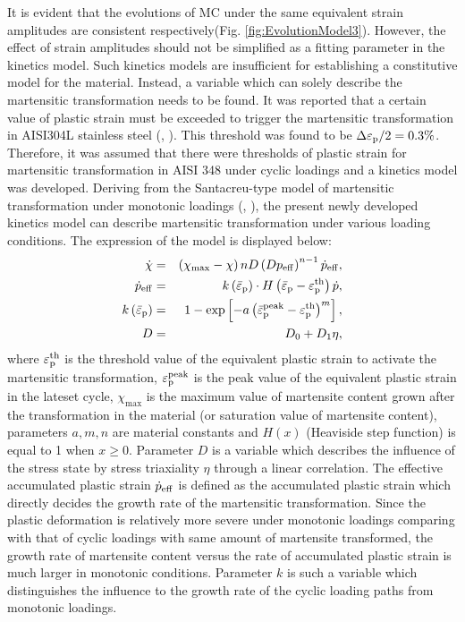 \documentclass[preprint,5p,twocolumn,10pt,sort&compress]{elsarticle}
\begin{document}
 It is evident that the evolutions of MC under the same equivalent strain amplitudes are consistent respectively(Fig. \ref{fig:EvolutionModel3}). However, the effect of strain amplitudes should not be simplified as a fitting parameter in the kinetics model. Such kinetics models are insufficient for establishing a constitutive model for the material. Instead, a variable which can solely describe the martensitic transformation needs to be found. It was reported that a certain value of plastic strain must be exceeded to trigger the martensitic transformation in AISI304L stainless steel (\citeauthor{Bayerlein1989Plasticity}, \citeyear{Bayerlein1989Plasticity}). This threshold was found to be $\Delta \varepsilon _{\rm p}/2=0.3\%$. Therefore, it was assumed that there were thresholds of plastic strain for martensitic transformation in AISI 348 under cyclic loadings and a kinetics model was developed. Deriving from the Santacreu-type model of martensitic transformation under monotonic loadings (\citeauthor{QSP2014}, \citeyear{QSP2014}), the present newly developed kinetics model can describe martensitic transformation under various loading conditions. The expression of the model is displayed below:
\begin{eqnarray}\label{eq:Kinetics model3}
\dot \chi &=&\left(\chi_{\max }-\chi\right) nD \left(D p_{\rm eff}\right)^{n-1}\dot p_{\rm eff},
\\
\dot{p}_{\rm eff}&=&k\left ( \bar{\varepsilon}_{\rm p} \right ) \cdot H\left(\bar{\varepsilon}_{\rm p}-\varepsilon_{\rm p}^{\rm th}\right) \dot{p} ,
\\
k\left ( \bar{\varepsilon}_{\rm p} \right )&=&1-\exp \left[-a\left(\bar{\varepsilon}_{\rm p}^{\rm peak}-\varepsilon_{\rm p}^{\rm th}\right)^{m}\right] ,
\\
D&=&D_{0}+D_{1}\eta,
\end{eqnarray}
where $\varepsilon_{\rm p}^{\rm th}$ is the threshold value of the equivalent plastic strain to activate the martensitic transformation, $\varepsilon_{\rm p}^{\rm peak}$ is the peak value of the equivalent plastic strain in the lateset cycle, $\chi_{\max}$ is the maximum value of martensite content grown after the transformation in the material (or saturation value of martensite content), parameters $a,m,n$ are material constants and $H\left  ( x \right )$ (Heaviside step function) is equal to 1 when $x\geq0$. Parameter $D$ is a variable which describes the influence of the stress state by stress triaxiality $\eta$ through a linear correlation. The effective accumulated plastic strain $\dot{p}_{\rm eff}$ is defined as the accumulated plastic strain which directly decides the growth rate of the martensitic transformation. Since the plastic deformation is relatively more severe under monotonic loadings comparing with that of cyclic loadings with same amount of martensite transformed, the growth rate of martensite content versus the rate of accumulated plastic strain is much larger in monotonic conditions. Parameter $k$ is such a variable which distinguishes the influence to the growth rate of the cyclic loading paths from monotonic loadings.
\end{document}
